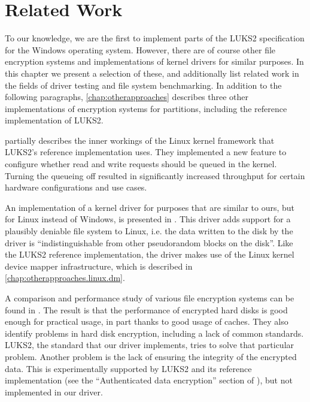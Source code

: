 \chapter{Related Work}
\label{chap:relatedwork}
To our knowledge, we are the first to implement parts of the LUKS2 specification for the Windows operating system. However, there are of course other file encryption systems and implementations of kernel drivers for similar purposes. In this chapter we present a selection of these, and additionally list related work in the fields of driver testing and file system benchmarking. In addition to the following paragraphs, \autoref{chap:otherapproaches} describes three other implementations of encryption systems for partitions, including the reference implementation of LUKS2.

\cite{Korchagin2020} partially describes the inner workings of the Linux kernel framework that LUKS2's reference implementation uses. They implemented a new feature to configure whether read and write requests should be queued in the kernel. Turning the queueing off resulted in significantly increased throughput for certain hardware configurations and use cases.%

An implementation of a kernel driver for purposes that are similar to ours, but for Linux instead of Windows, is presented in \cite{Barker2019}. This driver adds support for a plausibly deniable file system to Linux, i.e. the data written to the disk by the driver is ``indistinguishable from other pseudorandom blocks on the disk''. Like the LUKS2 reference implementation, the driver makes use of the Linux kernel device mapper infrastructure, which is described in \autoref{chap:otherapproaches.linux.dm}.

A comparison and performance study of various file encryption systems can be found in \cite{Wright2003}. The result is that the performance of encrypted hard disks is good enough for practical usage, in part thanks to good usage of caches. They also identify problems in hard disk encryption, including a lack of common standards. LUKS2, the standard that our driver implements, tries to solve that particular problem. Another problem is the lack of ensuring the integrity of the encrypted data. This is experimentally supported by LUKS2 and its reference implementation (see the ``Authenticated data encryption'' section of \cite{ManCryptsetup}), but not implemented in our driver.


